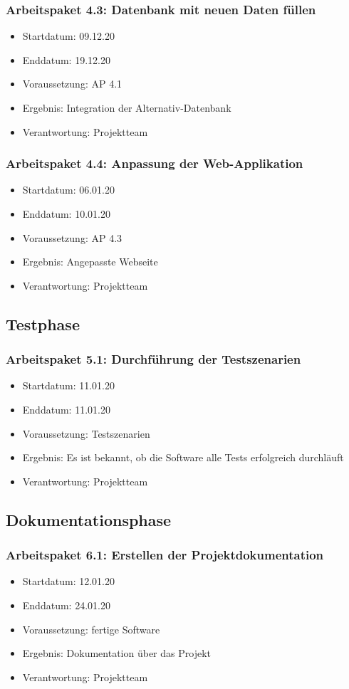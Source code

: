 \subsubsection*{Arbeitspaket 4.3: Datenbank mit neuen Daten füllen}
\begin{itemize}
\item Startdatum: 09.12.20
\item Enddatum: 19.12.20
\item Voraussetzung: AP 4.1
\item Ergebnis: Integration der Alternativ-Datenbank
\item Verantwortung: Projektteam
\end{itemize}
\subsubsection*{Arbeitspaket 4.4: Anpassung der Web-Applikation}
\begin{itemize}
\item Startdatum: 06.01.20
\item Enddatum: 10.01.20
\item Voraussetzung: AP 4.3
\item Ergebnis: Angepasste Webseite
\item Verantwortung: Projektteam
\end{itemize}
\subsection*{Testphase}
\subsubsection*{Arbeitspaket 5.1: Durchführung der Testszenarien}
\begin{itemize}
\item Startdatum: 11.01.20
\item Enddatum: 11.01.20
\item Voraussetzung: Testszenarien
\item Ergebnis: Es ist bekannt, ob die Software alle Tests erfolgreich durchläuft
\item Verantwortung: Projektteam
\end{itemize}
\subsection*{Dokumentationsphase}
\subsubsection*{Arbeitspaket 6.1: Erstellen der Projektdokumentation}
\begin{itemize}
\item Startdatum: 12.01.20
\item Enddatum: 24.01.20
\item Voraussetzung: fertige Software
\item Ergebnis: Dokumentation über das Projekt
\item Verantwortung: Projektteam
\end{itemize}
